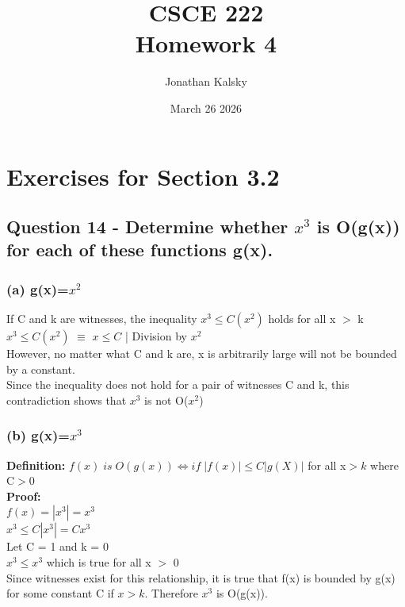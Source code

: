 \documentclass{article}
\author{Jonathan Kalsky}
\date{March 26 2026}
\title{\normalsize CSCE 222\\ \Large Homework 4}
\begin{document}
\maketitle
\tableofcontents
\vspace{1cm}

\section[3.2]{Exercises for Section 3.2}

\subsection[14]{Question 14 - Determine whether $x^3$ is O(g(x)) for each of these functions g(x).}

\subsubsection[a]{(a) g(x)=$x^2$}
If C and k are witnesses, the inequality $x^3 \leq C(x^2)$ holds for all x $>$ k\\
$x^3 \leq C(x^2)$ $\equiv$ $x \leq C$ | Division by $x^2$\\
However, no matter what C and k are, x is arbitrarily large will not be bounded by a constant. \\Since the inequality does not hold for a pair of witnesses C and k, this contradiction shows that $x^3$ is not O($x^2$)

\subsubsection[b]{(b) g(x)=$x^3$}
\textbf{Definition: }$f(x) \; is \;O(g(x)) \Longleftrightarrow if \; |f(x)| \leq C|g(X)|$ for all x$>k$ where C$>$0\\
\textbf{Proof:}\\
$f(x) = |x^3| = x^3$\\
$x^3 \leq C|x^3| = Cx^3$\\
Let C = 1 and k = 0\\
$x^3 \leq x^3$ which is true for all x $>$ 0\\
Since witnesses exist for this relationship, it is true that f(x) is bounded by g(x) for some constant C if $x>k$. Therefore $x^3$ is O(g(x)).
\end{document}
